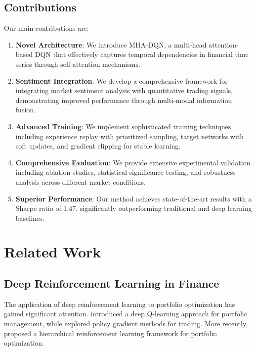 \documentclass[11pt,twocolumn]{article}
\theoremstyle{definition}
\begin{document}
\subsection{Contributions}

Our main contributions are:

\begin{enumerate}
\item \textbf{Novel Architecture}: We introduce MHA-DQN, a multi-head attention-based DQN that effectively captures temporal dependencies in financial time series through self-attention mechanisms.

\item \textbf{Sentiment Integration}: We develop a comprehensive framework for integrating market sentiment analysis with quantitative trading signals, demonstrating improved performance through multi-modal information fusion.

\item \textbf{Advanced Training}: We implement sophisticated training techniques including experience replay with prioritized sampling, target networks with soft updates, and gradient clipping for stable learning.

\item \textbf{Comprehensive Evaluation}: We provide extensive experimental validation including ablation studies, statistical significance testing, and robustness analysis across different market conditions.

\item \textbf{Superior Performance}: Our method achieves state-of-the-art results with a Sharpe ratio of 1.47, significantly outperforming traditional and deep learning baselines.
\end{enumerate}

\section{Related Work}

\subsection{Deep Reinforcement Learning in Finance}

The application of deep reinforcement learning to portfolio optimization has gained significant attention. \citet{jiang2017deep} introduced a deep Q-learning approach for portfolio management, while \citet{moody2001performance} explored policy gradient methods for trading. More recently, \citet{liu2019deep} proposed a hierarchical reinforcement learning framework for portfolio optimization.
\end{document}
